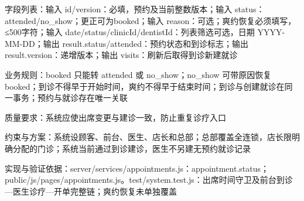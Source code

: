 \documentclass[UTF8,12pt,a4paper,fontset=none]{ctexart}
\begin{document}
字段列表：输入 id/\allowbreak{}version：必填，预约及当前整数版本；输入 status：attended/\allowbreak{}no\_\allowbreak{}show；更正可为booked；输入 reason：可选；爽约恢复必须填写，≤500字符；输入 date/\allowbreak{}status/\allowbreak{}clinicId/\allowbreak{}dentistId：列表筛选可选，日期 YYYY-MM-DD；输出 result.\allowbreak{}status/\allowbreak{}attended：预约状态和到诊标志；输出 result.\allowbreak{}version：递增版本；输出 visits：刷新后取得到诊新建就诊\par
业务规则：booked 只能转 attended 或 no\_\allowbreak{}show；no\_\allowbreak{}show 可带原因恢复 booked；到诊不得早于开始时间，爽约不得早于结束时间；到诊与创建就诊在同一事务；预约与就诊存在唯一关联\par
质量要求：系统应使出席变更与建诊一致，防止重复诊疗入口\par
约束与方案：系统设顾客、前台、医生、店长和总部；总部覆盖全连锁，店长限明确分配的门诊；系统当前通过到诊建诊，医生不另建无预约就诊记录\par
实现与验证依据：server/\allowbreak{}services/\allowbreak{}appointments.\allowbreak{}js：appointment.\allowbreak{}status；public/\allowbreak{}js/\allowbreak{}pages/\allowbreak{}appointments.\allowbreak{}js。test/\allowbreak{}system.\allowbreak{}test.\allowbreak{}js：出席时间守卫及前台到诊—医生诊疗—开单完整链；爽约恢复未单独覆盖\par
{}
\end{document}
